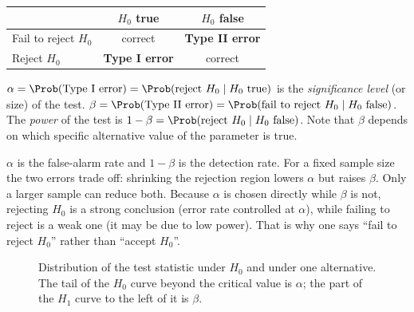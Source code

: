 \begin{definition}
\begin{center}
\begin{tabular}{lcc}
\toprule
 & $H_0$ true & $H_0$ false \\
\midrule
Fail to reject $H_0$ & correct & \textbf{Type II error} \\
Reject $H_0$ & \textbf{Type I error} & correct \\
\bottomrule
\end{tabular}
\end{center}
$\alpha=\Prob(\text{Type I error})=\Prob(\text{reject }H_0\mid H_0\text{ true})$ is the \emph{significance level} (or size) of the test. $\beta=\Prob(\text{Type II error})=\Prob(\text{fail to reject }H_0\mid H_0\text{ false})$. The \emph{power} of the test is $1-\beta=\Prob(\text{reject }H_0\mid H_0\text{ false})$. Note that $\beta$ depends on which specific alternative value of the parameter is true.
\end{definition}

\begin{intuition}
$\alpha$ is the false-alarm rate and $1-\beta$ is the detection rate. For a fixed sample size the two errors trade off: shrinking the rejection region lowers $\alpha$ but raises $\beta$. Only a larger sample can reduce both. Because $\alpha$ is chosen directly while $\beta$ is not, rejecting $H_0$ is a strong conclusion (error rate controlled at $\alpha$), while failing to reject is a weak one (it may be due to low power). That is why one says ``fail to reject $H_0$'' rather than ``accept $H_0$''.
\end{intuition}

\begin{figure}[h]
\centering
{}
\caption{Distribution of the test statistic under $H_0$ and under one alternative. The tail of the $H_0$ curve beyond the critical value is $\alpha$; the part of the $H_1$ curve to the left of it is $\beta$.}
\end{figure}

